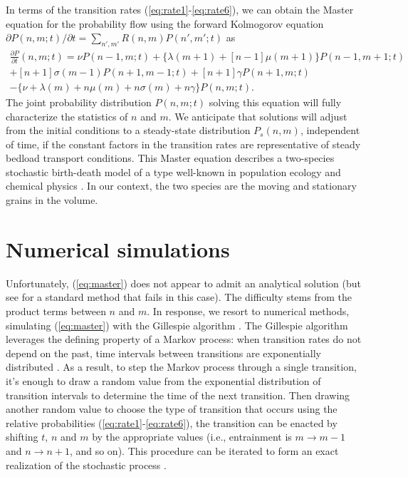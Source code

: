 \documentclass[draft]{agujournal2018}
\begin{document}
In terms of the transition rates (\ref{eq:rate1}-\ref{eq:rate6}), we can obtain the Master equation for the probability flow using the forward Kolmogorov equation $\partial P(n,m;t)/\partial t = 
\sum_{n',m'} R(n,m)P(n',m';t)$ \citep[e.g.,][]{Cox1965, Gillespie1992, Ancey2008} as 
\begin{multline}
 \frac{\partial P}{\partial t}(n,m;t) =  
\nu P(n-1,m;t) + 
\{\lambda(m+1) + [n-1]\mu(m+1)\}P(n-1,m+1;t)\\ + 
[n+1]\sigma(m-1)P(n+1,m-1;t) + 
[n+1]\gamma P(n+1,m;t) \\- 
\{ \nu + \lambda(m) + n\mu(m) + n\sigma(m) + n \gamma \}P(n,m;t).
 \label{eq:master}
\end{multline}
The joint probability distribution $P(n,m;t)$ solving this equation will fully characterize the statistics of $n$ and $m$.
We anticipate that solutions will adjust from the initial conditions to a steady-state distribution $P_s(n,m)$, independent of time, if the constant factors in the transition rates are representative of steady bedload transport conditions.
This Master equation describes a two-species stochastic birth-death model \citep[e.g.,][]{Cox1965} of a type well-known in population ecology \citep[e.g.,][]{Pielou1977, Swift2002} and chemical physics \citep[e.g.,][]{Gardiner1983}.
In our context, the two species are the moving and stationary grains in the volume.

\section{Numerical simulations}

Unfortunately, (\ref{eq:master}) does not appear to admit an analytical solution (but see \citet{Swift2002} for a standard method that fails in this case).
The difficulty stems from the product terms between $n$ and $m$.
In response, we resort to numerical methods, simulating (\ref{eq:master}) with the Gillespie algorithm \citep{Gillespie1977, Gillespie1992, Gillespie2007}.
The Gillespie algorithm leverages the defining property of a Markov process: when transition rates do not depend on the past, time intervals between transitions are exponentially distributed \citep[e.g.,][]{Cox1965}.
As a result, to step the Markov process through a single transition, it's enough to draw a random value from the exponential distribution of transition intervals to determine the time of the next transition.
Then drawing another random value to choose the type of transition that occurs using the relative probabilities (\ref{eq:rate1}-\ref{eq:rate6}), the transition can be enacted by shifting $t$, $n$ and $m$ by the appropriate values (i.e., entrainment is $m\rightarrow m-1$ and $n \rightarrow n+1$, and so on).
This procedure can be iterated to form an exact realization of the stochastic process \citep[e.g.,][]{Gillespie2007}.
\end{document}
